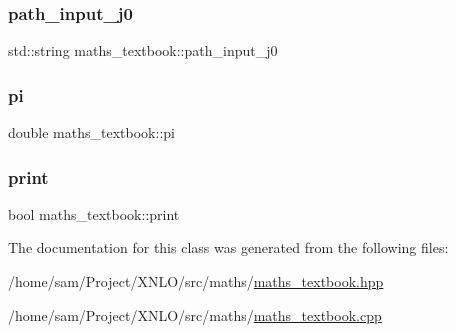 \mbox{\label{classmaths__textbook_a5c8a254bd117beaba43916c38f8f6a66}} 
\subsubsection{\texorpdfstring{path\+\_\+input\+\_\+j0}{path\_input\_j0}}
{\footnotesize\ttfamily std\+::string maths\+\_\+textbook\+::path\+\_\+input\+\_\+j0\hspace{0.3cm}{\ttfamily [private]}}

\mbox{\label{classmaths__textbook_a96b811ef2a81ca51b98cf2a10c8ac5bc}} 
\subsubsection{\texorpdfstring{pi}{pi}}
{\footnotesize\ttfamily double maths\+\_\+textbook\+::pi}

\mbox{\label{classmaths__textbook_ae2a8fbebf9b44587f2d21df219c10812}} 
\subsubsection{\texorpdfstring{print}{print}}
{\footnotesize\ttfamily bool maths\+\_\+textbook\+::print}



The documentation for this class was generated from the following files\+:\begin{DoxyCompactItemize}
\item 
/home/sam/\+Project/\+X\+N\+L\+O/src/maths/\hyperlink{maths__textbook_8hpp}{maths\+\_\+textbook.\+hpp}\item 
/home/sam/\+Project/\+X\+N\+L\+O/src/maths/\hyperlink{maths__textbook_8cpp}{maths\+\_\+textbook.\+cpp}\end{DoxyCompactItemize}
